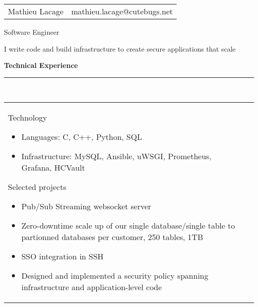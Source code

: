 \documentclass[a4paper,12pt]{article}
\newcommand{\ligne}[1]{\rule[0.5ex]{\textwidth}{#1}\\}
\newcommand{\styleRub}[1]{\textbf{\large #1}\par}
\newcommand{\indentStd}{\noindent\hspace*{10pt}}
\newenvironment{rubrique}[2][\linewidth]%
{\styleRub{#2}%
\ligne{0.5mm}
\setlength{\lenB}{#1}%
\setlength{\lenC}{\linewidth}%
\addtolength{\lenC}{-\lenA}%
\addtolength{\lenC}{-\lenB}%
\addtolength{\lenC}{-19pt}
\indentStd\begin{tabular}[t]{p{\lenB}p{\lenC}}}
{\end{tabular}}
\newlength{\lenA} %
\newlength{\lenB} %
\newlength{\lenC} %
\begin{document}
\begin{tabular*}{1\textwidth}{@{\extracolsep{\fill}}lr}
Mathieu Lacage & mathieu.lacage@cutebugs.net\\
\end{tabular*}

\vspace{1cm}
\begin{center}{\huge Software Engineer}\end{center}

\begin{center}
I write code and build infrastructure to create
secure applications that scale
\end{center}

\vspace{1cm}
\begin{rubrique}{Technical Experience}

Technology
\begin{itemize}
\item Languages: C, C++, Python, SQL
\item Infrastructure: MySQL, Ansible, uWSGI, Prometheus, Grafana, HCVault
\end{itemize}

Selected projects
\begin{itemize}
\item Pub/Sub Streaming websocket server
\item Zero-downtime scale up of our single database/single table to partionned
 databases per customer, 250 tables, 1TB
\item SSO integration in SSH
\item Designed and implemented a security policy spanning 
infrastructure and application-level code
\end{itemize}

\end{rubrique}
\end{document}
